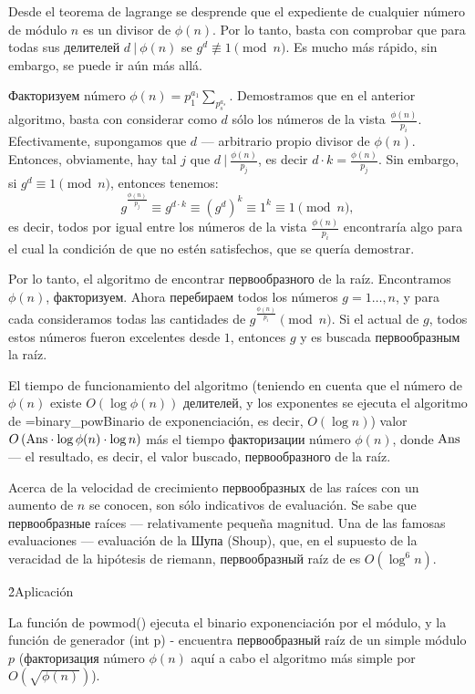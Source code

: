Desde el teorema de lagrange se desprende que el expediente de cualquier número de módulo $n$ es un divisor de $\phi(n)$. Por lo tanto, basta con comprobar que para todas sus делителей $d\ |\ \phi(n)$ se $g^d \not\equiv 1 \pmod{n}$. Es mucho más rápido, sin embargo, se puede ir aún más allá.

Факторизуем número $\phi(n) = p_1^{a_1} \sum_ p_s^{a_s}$. Demostramos que en el anterior algoritmo, basta con considerar como $d$ sólo los números de la vista $\frac{ \phi(n) }{ p_i }$. Efectivamente, supongamos que $d$ --- arbitrario propio divisor de $\phi(n)$. Entonces, obviamente, hay tal $j$ que $d\ |\ \frac{ \phi(n) }{ p_j }$, es decir $d \cdot k = \frac{ \phi(n) }{ p_j }$. Sin embargo, si $g^d \equiv 1 \pmod{n}$, entonces tenemos:
$$ g^{\frac{ \phi(n) }{ p_j }} \equiv g^{d \cdot k} \equiv {\left( g^d \right) }^k \equiv 1^k \equiv 1 \pmod{n}, $$
es decir, todos por igual entre los números de la vista $\frac{ \phi(n) }{ p_i }$ encontraría algo para el cual la condición de que no estén satisfechos, que se quería demostrar.

Por lo tanto, el algoritmo de encontrar первообразного de la raíz. Encontramos $\phi(n)$, факторизуем. Ahora перебираем todos los números $g = 1 \ldots, n$, y para cada consideramos todas las cantidades de $g^{ \frac{ \phi(n) }{ p_i } } \pmod{n}$. Si el actual de $g$, todos estos números fueron excelentes desde $1$, entonces $g$ y es buscada первообразным la raíz.

El tiempo de funcionamiento del algoritmo (teniendo en cuenta que el número de $\phi(n)$ existe $O \left( \log \phi(n) \right)$ делителей, y los exponentes se ejecuta el algoritmo de \algohref=binary_pow{Binario de exponenciación}, es decir, $O(\log n)$) valor $O \left( {\rm Ans} \cdot \log \phi(n) \cdot \log n \right)$ más el tiempo факторизации número $\phi(n)$, donde $\rm Ans$ --- el resultado, es decir, el valor buscado, первообразного de la raíz.

Acerca de la velocidad de crecimiento первообразных de las raíces con un aumento de $n$ se conocen, son sólo indicativos de evaluación. Se sabe que первообразные raíces --- relativamente pequeña magnitud. Una de las famosas evaluaciones --- evaluación de la Шупа (Shoup), que, en el supuesto de la veracidad de la hipótesis de riemann, первообразный raíz de es $O (\log^6 n)$.

\h2{Aplicación}

La función de powmod() ejecuta el binario exponenciación por el módulo, y la función de generador (int p) - encuentra первообразный raíz de un simple módulo $p$ (факторизация número $\phi(n)$ aquí a cabo el algoritmo más simple por $O( \sqrt{ \phi(n) } )$).

